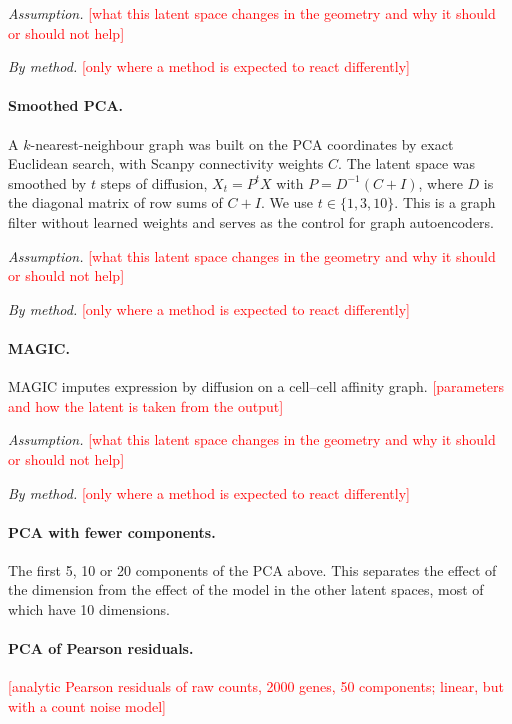 \documentclass[10pt,a4paper,twocolumn]{article}
\newcommand{\todo}[1]{\textcolor{red}{[#1]}}
\begin{document}
\emph{Assumption.} \todo{what this latent space changes in the geometry and why it should or should not help}

\emph{By method.} \todo{only where a method is expected to react differently}

\paragraph{Smoothed PCA.}
A $k$-nearest-neighbour graph was built on the PCA coordinates by exact Euclidean
search, with Scanpy connectivity weights $C$. The latent space was smoothed by $t$ steps of
diffusion, $X_t = P^t X$ with $P = D^{-1}(C+I)$, where $D$ is the diagonal matrix of row sums
of $C+I$. We use $t \in \{1, 3, 10\}$. This is a graph filter without learned weights and serves
as the control for graph autoencoders.

\emph{Assumption.} \todo{what this latent space changes in the geometry and why it should or should not help}

\emph{By method.} \todo{only where a method is expected to react differently}

\paragraph{MAGIC.}
MAGIC \cite{vandijk2018magic} imputes expression by diffusion on a cell--cell affinity graph.
\todo{parameters and how the latent is taken from the output}

\emph{Assumption.} \todo{what this latent space changes in the geometry and why it should or should not help}

\emph{By method.} \todo{only where a method is expected to react differently}

\paragraph{PCA with fewer components.}
The first 5, 10 or 20 components of the PCA above. This separates the effect of the
dimension from the effect of the model in the other latent spaces, most of which have 10
dimensions.

\paragraph{PCA of Pearson residuals.}
\todo{analytic Pearson residuals \cite{TODO-lause2021} of raw counts, 2000 genes, 50 components;
linear, but with a count noise model}
\end{document}
